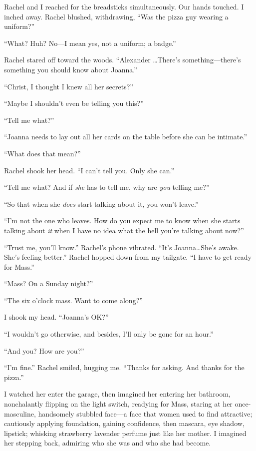 Rachel and I reached for the breadsticks simultaneously. Our hands
touched. I inched away. Rachel blushed, withdrawing, ``Was the pizza guy
wearing a uniform?''

``What? Huh? No---I mean yes, not a uniform; a badge.''

Rachel stared off toward the woods. ``Alexander \ldots There's
some\-thing---there's something you should know about Joanna.''

``Christ, I thought I knew all her secrets?''

``Maybe I shouldn't even be telling you this?''

``Tell me what?''

``Joanna needs to lay out all her cards on the table before she can be
intimate.''

``What does that mean?''

Rachel shook her head. ``I can't tell you. Only she can.''

``Tell me what? And if \emph{she} has to tell me, why are \emph{you}
telling me?''

``So that when she \emph{does} start talking about it, you won't
leave.''

``I'm not the one who leaves. How do you expect me to know when she
starts talking about \emph{it} when I have no idea what the hell you're
talking about now?''

``Trust me, you'll know.'' Rachel's phone vibrated. ``It's
Joanna\ldots \linebreak She's awake. She's feeling better.'' Rachel hopped down
from my tailgate. ``I have to get ready for Mass.''

``Mass? On a Sunday night?''

``The six o'clock mass. Want to come along?''

I shook my head. ``Joanna's OK?''

``I wouldn't go otherwise, and besides, I'll only be gone for an hour.''

``And you? How are you?''

``I'm fine.'' Rachel smiled, hugging me. ``Thanks for asking. And thanks
for the pizza.''

I watched her enter the garage, then imagined her entering her bathroom,
nonchalantly flipping on the light switch, readying for Mass, staring at
her once-masculine, handsomely stubbled face---a face that women used to
find attractive; cautiously applying foundation, gaining confidence,
then mascara, eye shadow, lipstick; whisking strawberry lavender perfume
just like her mother. I imagined her stepping back, admiring who she was
and who she had become.

